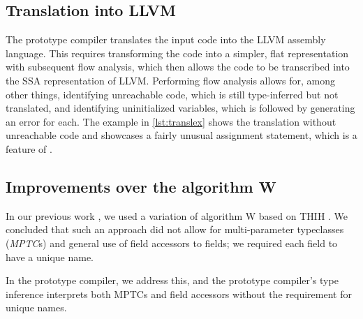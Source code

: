 \subsection{Translation into LLVM}

The prototype compiler translates the input code into the LLVM assembly language. This requires transforming the code into a simpler, flat representation with subsequent flow analysis, which then allows the code to be transcribed into the SSA representation of LLVM. Performing flow analysis allows for, among other things, identifying unreachable code, which is still type-inferred but not translated, and identifying uninitialized variables, which is followed by generating an error for each. The example in \cref{lst:translex} shows the translation without unreachable code and showcases a fairly unusual assignment statement, which is a feature of \cmm.

\subsection{Improvements over the algorithm W}

In our previous work \cite{klepl2020type}, we used a variation of algorithm W based on THIH \cite{jones1999typing}. We concluded that such an approach did not allow for multi-parameter typeclasses (\emph{MPTC}s) and general use of field accessors to  fields; we required each field to have a unique name.

In the prototype compiler, we address this, and the prototype compiler's type inference interprets both MPTCs and field accessors without the requirement for unique names.

